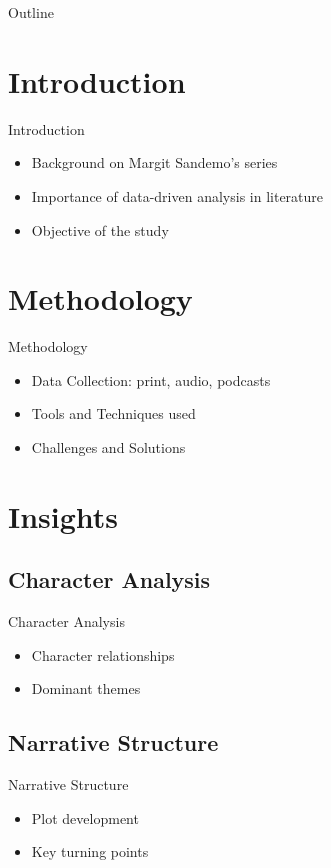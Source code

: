 \documentclass[
    NAME={Dr. Helga Ingimundardóttir},
    EMAIL={helgaingim@hi.is},
    FACULTY={Industrial Engineering Department},
    PRETITLE={Pushing Boundaries},
    TITLE={A Data-Driven Dive into `Legend of the Ice People'},
    SUBTITLE={Unravel the unexpected synergy of literature and data science},
    SEMINAR={Haustráðstefna Advania},
    DATE={September 8, 2023}
    ]{hi-latex/hi-beamer}
\begin{document}
\begin{frame}{Outline}
  \tableofcontents
\end{frame}

\section{Introduction}





\begin{frame}{Introduction}
  \begin{itemize}
    \item Background on Margit Sandemo's series
    \item Importance of data-driven analysis in literature
    \item Objective of the study
  \end{itemize}
\end{frame}

\section{Methodology}
\begin{frame}{Methodology}
  \begin{itemize}
    \item Data Collection: print, audio, podcasts
    \item Tools and Techniques used
    \item Challenges and Solutions
  \end{itemize}
\end{frame}

\section{Insights}
\subsection{Character Analysis}
\begin{frame}{Character Analysis}
  \begin{itemize}
    \item Character relationships
    \item Dominant themes
  \end{itemize}
\end{frame}

\subsection{Narrative Structure}
\begin{frame}{Narrative Structure}
  \begin{itemize}
    \item Plot development
    \item Key turning points
  \end{itemize}
\end{frame}
\end{document}
